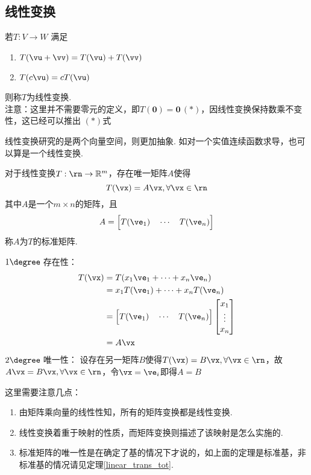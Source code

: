 \subsection{线性变换}
\begin{definition}
若$T:V\to W$ 满足
\begin{enumerate}
	\item $T(\vu+\vv)=T(\vu)+T(\vv)$
	\item $T(c\vu)=cT(\vu)$
\end{enumerate}
则称$T$为线性变换.\\
注意：这里并不需要零元的定义，即$T(\mathbf{0})=\mathbf{0}\,(*)$，因线性变换保持数乘不变性，这已经可以推出 $(*)$式
\end{definition}
\par 线性变换研究的是两个向量空间，则更加抽象. 如对一个实值连续函数求导，也可以算是一个线性变换.
\begin{theorem}[标准(standard)矩阵]
对于线性变换$T:\rn\to\mathbb{R}^m$，存在唯一矩阵$A$使得
\[T(\vx)=A\vx,\forall\vx\in\rn\]
其中$A$是一个$m\times n$的矩阵，且
\[A=\Big[T(\ve_1)\quad\cdots\quad T(\ve_n)\Big]\]
称$A$为$T$的标准矩阵.
\end{theorem}
\begin{analysis}
$1\degree\;$存在性：
\[\begin{aligned}T(\vx) &= T(x_1\ve_1+\cdots+x_n\ve_n)\\
&= x_1T(\ve_1)+\cdots+x_nT(\ve_n)\\
&= \Big[T(\ve_1)\quad\cdots\quad T(\ve_n)\Big]\begin{bmatrix}x_1\\\vdots\\x_n\end{bmatrix}\\
&= A\vx
\end{aligned}\]
$2\degree\;$唯一性：
设存在另一矩阵$B$使得$T(\vx)=B\vx,\forall\vx\in\rn$，故$A\vx=B\vx,\forall\vx\in\rn$，令$\vx=\ve_i$即得$A=B$
\end{analysis}
这里需要注意几点：
\begin{enumerate}
	\item 由矩阵乘向量的线性性知，所有的矩阵变换都是线性变换.
	\item 线性变换着重于映射的性质，而矩阵变换则描述了该映射是怎么实施的.
	\item 标准矩阵的唯一性是在确定了基的情况下才说的，如上面的定理是标准基，非标准基的情况请见定理\ref{linear_trans_tot}.
\end{enumerate}
